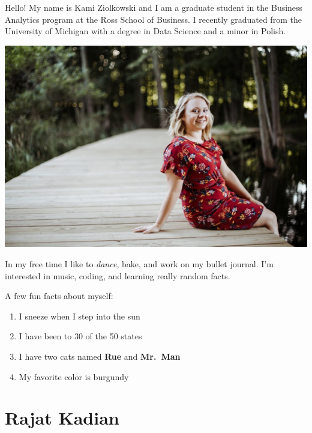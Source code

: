 \documentclass[
]{book}
\providecommand{\tightlist}{%
  \setlength{\itemsep}{0pt}\setlength{\parskip}{0pt}}
\begin{document}
Hello! My name is Kami Ziolkowski and I am a graduate student in the Business Analytics program at the Ross School of Business. I recently graduated from the University of Michigan with a degree in Data Science and a minor in Polish.

\includegraphics{me2.jpg}

In my free time I like to \emph{dance}, bake, and work on my bullet journal. I'm interested in music, coding, and learning really random facts.

A few fun facts about myself:

\begin{enumerate}
\def\labelenumi{\arabic{enumi}.}
\tightlist
\item
  I sneeze when I step into the sun
\item
  I have been to 30 of the 50 states
\item
  I have two cats named \textbf{Rue} and \textbf{Mr.~Man}
\item
  My favorite color is burgundy
\end{enumerate}

\hypertarget{rajat-kadian}{%
\section{Rajat Kadian}\label{rajat-kadian}}
\end{document}
